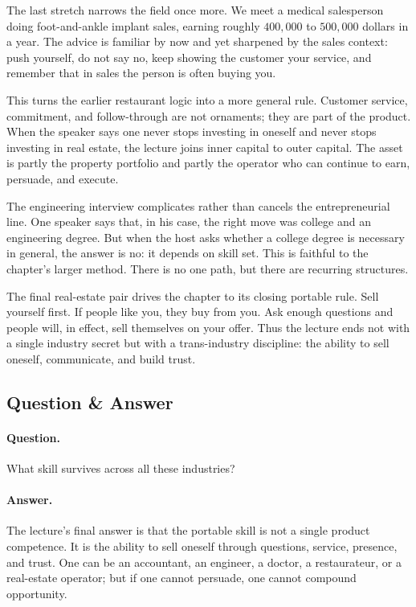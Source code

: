The last stretch narrows the field once more. We meet a medical salesperson doing foot-and-ankle implant sales, earning roughly \(400{,}000\) to \(500{,}000\) dollars in a year. The advice is familiar by now and yet sharpened by the sales context: push yourself, do not say no, keep showing the customer your service, and remember that in sales the person is often buying you.

This turns the earlier restaurant logic into a more general rule. Customer service, commitment, and follow-through are not ornaments; they are part of the product. When the speaker says one never stops investing in oneself and never stops investing in real estate, the lecture joins inner capital to outer capital. The asset is partly the property portfolio and partly the operator who can continue to earn, persuade, and execute.

The engineering interview complicates rather than cancels the entrepreneurial line. One speaker says that, in his case, the right move was college and an engineering degree. But when the host asks whether a college degree is necessary in general, the answer is no: it depends on skill set. This is faithful to the chapter's larger method. There is no one path, but there are recurring structures.

The final real-estate pair drives the chapter to its closing portable rule. Sell yourself first. If people like you, they buy from you. Ask enough questions and people will, in effect, sell themselves on your offer. Thus the lecture ends not with a single industry secret but with a trans-industry discipline: the ability to sell oneself, communicate, and build trust.

\subsection{Question \& Answer}

\paragraph{Question.} What skill survives across all these industries?

\paragraph{Answer.} The lecture's final answer is that the portable skill is not a single product competence. It is the ability to sell oneself through questions, service, presence, and trust. One can be an accountant, an engineer, a doctor, a restaurateur, or a real-estate operator; but if one cannot persuade, one cannot compound opportunity.

